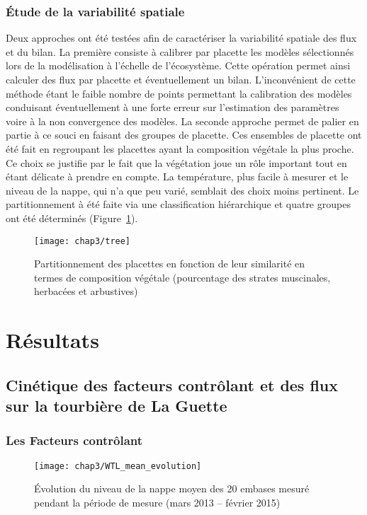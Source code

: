 \subsubsection{Étude de la variabilité spatiale}

Deux approches ont été testées afin de caractériser la variabilité spatiale des flux et du bilan.
La première consiste à calibrer par placette les modèles sélectionnés lors de la modélisation à l'échelle de l'écosystème.
Cette opération permet ainsi calculer des flux par placette et éventuellement un bilan.
L'inconvénient de cette méthode étant le faible nombre de points permettant la calibration des modèles conduisant éventuellement à une forte erreur sur l'estimation des paramètres voire à la non convergence des modèles.
La seconde approche permet de palier en partie à ce souci en faisant des groupes de placette.
Ces ensembles de placette ont été fait en regroupant les placettes ayant la composition végétale la plus proche.
Ce choix se justifie par le fait que la végétation joue un rôle important tout en étant délicate à prendre en compte.
La température, plus facile à mesurer et le niveau de la nappe, qui n'a que peu varié, semblait des choix moins pertinent. 
Le partitionnement à été faite via une classification hiérarchique et quatre groupes ont été déterminés (Figure~\ref{fig:tree}).

\begin{figure}[t]
\centering
\texttt{[image: chap3/tree]}
\caption{Partitionnement des placettes en fonction de leur similarité en termes de composition végétale (pourcentage des strates muscinales, herbacées et arbustives)}
\label{fig:tree}
\end{figure}



\section{Résultats}

\subsection{Cinétique des facteurs contrôlant et des flux sur la tourbière de La Guette}

\subsubsection{Les Facteurs contrôlant}

\begin{figure}
\centering
\texttt{[image: chap3/WTL\_mean\_evolution]}
\caption{Évolution du niveau de la nappe moyen des 20 embases mesuré pendant la période de mesure (mars 2013 -- février 2015)}
\label{fig:WTL_mean_evolution}
\end{figure}


